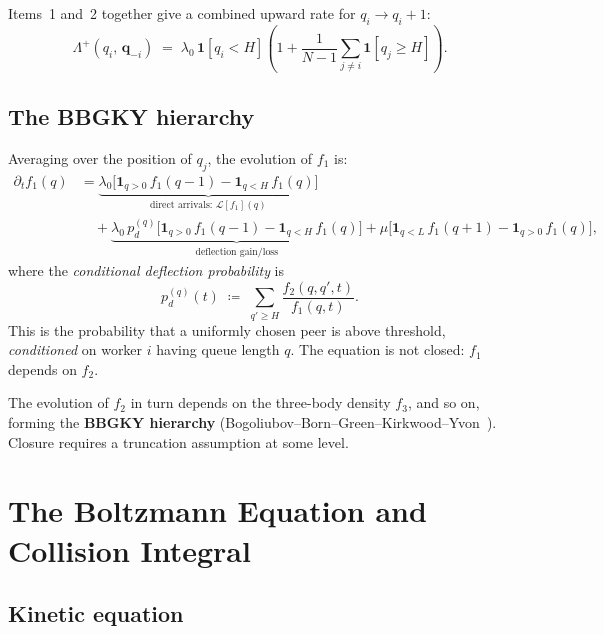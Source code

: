 \documentclass[11pt,a4paper]{article}
\newcommand{\pd}{p_d}
\newcommand{\fone}{f_1}
\newcommand{\ftwo}{f_2}
\newcommand{\cL}{\mathcal{L}}
\begin{document}
Items~1 and~2 together give a combined upward rate for $q_i \to q_i + 1$:
\[
  \Lambda^+(q_i,\, \mathbf{q}_{-i})
  \;=\; \lambda_0\, \mathbf{1}[q_i < H]
  \left(1 + \frac{1}{N-1}\sum_{j \neq i} \mathbf{1}[q_j \geq H]\right).
\]

\subsection{The BBGKY hierarchy}

Averaging over the position of $q_j$, the evolution of $\fone$ is:
\begin{align}
  \partial_t \fone(q)
  &= \underbrace{
    \lambda_0\bigl[\mathbf{1}_{q>0}\,\fone(q-1)
    - \mathbf{1}_{q<H}\,\fone(q)\bigr]
  }_{\text{direct arrivals: }\cL[\fone](q)}
  \nonumber\\
  &\quad
  + \underbrace{
    \lambda_0\,\pd^{(q)}\bigl[
      \mathbf{1}_{q>0}\,\fone(q-1) - \mathbf{1}_{q<H}\,\fone(q)
    \bigr]
  }_{\text{deflection gain/loss}}
  + \mu\bigl[\mathbf{1}_{q<L}\,\fone(q+1) - \mathbf{1}_{q>0}\,\fone(q)\bigr],
  \label{eq:bbgky1}
\end{align}
where the \emph{conditional deflection probability} is
\begin{equation}
  \pd^{(q)}(t)
  \;\coloneqq\; \sum_{q' \geq H} \frac{\ftwo(q, q', t)}{\fone(q, t)}.
  \label{eq:cond-pd}
\end{equation}
This is the probability that a uniformly chosen peer is above threshold,
\emph{conditioned} on worker $i$ having queue length $q$.
The equation is not closed: $\fone$ depends on $\ftwo$.

The evolution of $\ftwo$ in turn depends on the three-body density $f_3$,
and so on, forming the \textbf{BBGKY hierarchy}
(Bogoliubov--Born--Green--Kirkwood--Yvon~\cite{bogoliubov1946,born_green1949,kirkwood1946,yvon1935}).  Closure requires a truncation
assumption at some level.

\section{The Boltzmann Equation and Collision Integral}

\subsection{Kinetic equation}
\end{document}
